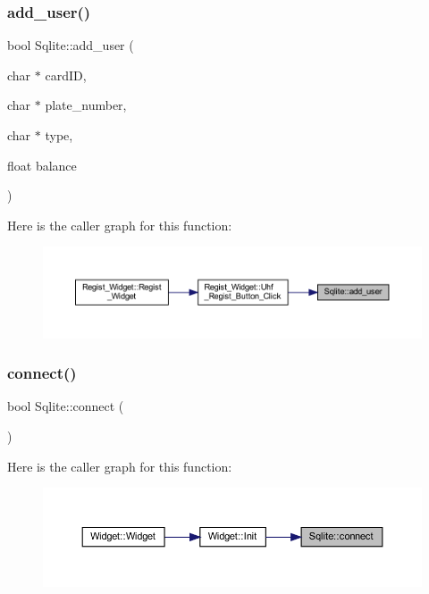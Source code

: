 \subsubsection{\texorpdfstring{add\_user()}{add\_user()}}
{\footnotesize\ttfamily bool Sqlite\+::add\+\_\+user (\begin{DoxyParamCaption}\item[{char $\ast$}]{card\+ID,  }\item[{char $\ast$}]{plate\+\_\+number,  }\item[{char $\ast$}]{type,  }\item[{float}]{balance }\end{DoxyParamCaption})}

Here is the caller graph for this function\+:
\nopagebreak
\begin{figure}[H]
\begin{center}
\leavevmode
\includegraphics[width=350pt]{class_sqlite_a1e45937d38905ad013e0858ad95d5ffd_icgraph}
\end{center}
\end{figure}
\mbox{\label{class_sqlite_af3e9ee9a4f73cfc86936a5cdee703c31}} 
\subsubsection{\texorpdfstring{connect()}{connect()}}
{\footnotesize\ttfamily bool Sqlite\+::connect (\begin{DoxyParamCaption}{ }\end{DoxyParamCaption})}

Here is the caller graph for this function\+:
\nopagebreak
\begin{figure}[H]
\begin{center}
\leavevmode
\includegraphics[width=350pt]{class_sqlite_af3e9ee9a4f73cfc86936a5cdee703c31_icgraph}
\end{center}
\end{figure}
\mbox{\label{class_sqlite_a30cc57d4645d2e63b3b3ee07f6ab1c94}} 
